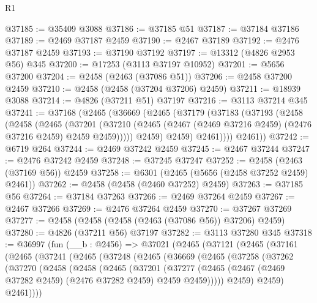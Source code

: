 \begin{lexlean}{R1}
\begin{coremodule}
@37185 := @35409 @3088
@37186 := @37185 @51
@37187 := @37184 @37186
@37189 := @2469 @37187 @2459
@37190 := @2467 @37189
@37192 := @2476 @37187 @2459
@37193 := @37190 @37192
@37197 := @13312 (@4826 @2953 @56) @345
@37200 := @17253 (@3113 @37197 @10952)
@37201 := @5656 @37200
@37204 := @2458 (@2463 (@37086 @51))
@37206 := @2458 @37200 @2459
@37210 := @2458 (@2458 (@37204 @37206) @2459)
@37211 := @18939 @3088
@37214 := @4826 (@37211 @51) @37197
@37216 := @3113 @37214 @345
@37241 := @37168
    (@2465
      (@36669
        (@2465
          (@37179
            (@37183
              (@37193
                (@2458
                  (@2458
                    (@2465
                      (@37201
                        (@37210
                          (@2465 (@2467 (@2469 @37216 @2459) (@2476 @37216 @2459) @2459 @2459)))))
                    @2459)
                  @2459)
                @2461))))
        @2461))
@37242 := @6719 @264
@37244 := @2469 @37242 @2459
@37245 := @2467 @37244
@37247 := @2476 @37242 @2459
@37248 := @37245 @37247
@37252 := @2458 (@2463 (@37169 @56)) @2459
@37258 := @6301 (@2465 (@5656 (@2458 @37252 @2459) @2461))
@37262 := @2458 (@2458 (@2460 @37252) @2459)
@37263 := @37185 @56
@37264 := @37184 @37263
@37266 := @2469 @37264 @2459
@37267 := @2467 @37266
@37269 := @2476 @37264 @2459
@37270 := @37267 @37269
@37277 := @2458 (@2458 (@2458 (@2463 (@37086 @56)) @37206) @2459)
@37280 := @4826 (@37211 @56) @37197
@37282 := @3113 @37280 @345
@37318 := @36997
    (fun (__b : @2456) =>
    @37021
      (@2465
        (@37121
          (@2465
            (@37161
              (@2465
                (@37241
                  (@2465
                    (@37248
                      (@2465
                        (@36669
                          (@2465
                            (@37258
                              (@37262
                                (@37270
                                  (@2458
                                    (@2458
                                      (@2465
                                        (@37201
                                          (@37277
                                            (@2465
                                              (@2467
                                                (@2469 @37282 @2459)
                                                (@2476 @37282 @2459)
                                                @2459
                                                @2459)))))
                                      @2459)
                                    @2459)
                                  @2461))))

\end{coremodule}
\end{lexlean}
